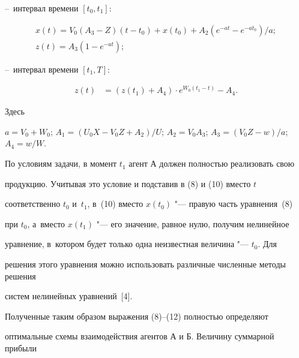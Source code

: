 --~интервал времени $[t_0, t_1]:$

\begin{gather}

\label{f10}

           x(t)=V_0(A_3-Z)(t-t_0)+x(t_0)+A_2\left(e^{-at}-e^{-at_0}\right)/a;\\

\label{f11}

           z(t)=A_3(1-e^{-at});

\end{gather}



--~интервал времени $[t_1, T]:$

\begin{equation}

\label{f12}

   \begin{aligned}

        z(t)&=\left(z(t_1)+A_4\right)\cdot e^{W_0(t_1-t)}-A_4.

   \end{aligned}

\end{equation}



Здесь

$a=V_0+W_0$; $A_1=(U_0X-V_0Z+A_2)/U$; $A_2=V_0A_3$; $A_3=(V_0Z-w)/a$; $A_4=w/W$.





По условиям задачи, в момент $t_1$ агент А должен полностью реализовать свою

продукцию. Учитывая это условие и подставив в (8) и (10) вместо $t$

соответственно $t_0$ и~$t_1$, в~(10) вместо $x(t_0)$ "--- правую часть уравнения~(8)

при $t_0$, а~вместо $x(t_1)$ "--- его значение, равное нулю, получим нелинейное

уравнение, в~котором будет только одна неизвестная величина "---  $t_0$. Для

решения этого уравнения можно использовать различные численные методы решения

систем нелинейных уравнений~[4].



Полученные таким образом выражения (8)--(12) полностью определяют

оптимальные схемы взаимодействия агентов А и Б.  Величину суммарной прибыли


